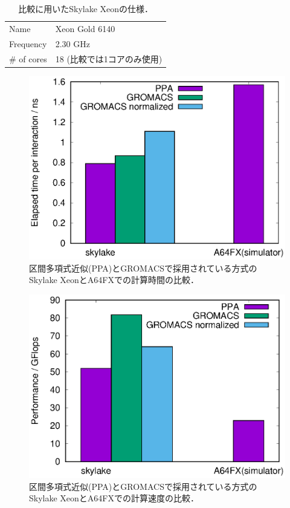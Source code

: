 \documentclass[uplatex,11pt,a4j,titlepage,oneside,openright,dvipdfmx]{jsbook}
\begin{document}
  \begin{table}
   \centering
  \caption{比較に用いたSkylake Xeonの仕様．}
  \label{tab:skylake}
  \begin{tabular}{l l}
   \hline \hline
   Name & Xeon Gold 6140 \\
   Frequency & 2.30 GHz \\
   \# of cores & 18 (比較では1コアのみ使用)\\
   \hline \hline
  \end{tabular}
  \end{table}

\begin{figure}
 \centering
 \includegraphics[width=12.0cm]{figure/comp_skylake_elapsed_time.eps}
 \caption[]{区間多項式近似(PPA)とGROMACSで採用されている方式のSkylake XeonとA64FXでの計算時間の比較．}
 \label{fig:comp_skylake_elapsed_time}
\end{figure}

\begin{figure}
 \centering
 \includegraphics[width=12.0cm]{figure/comp_skylake_performance.eps}
 \caption[]{区間多項式近似(PPA)とGROMACSで採用されている方式のSkylake XeonとA64FXでの計算速度の比較．}
 \label{fig:comp_skylake_performance}
\end{figure}
\end{document}
